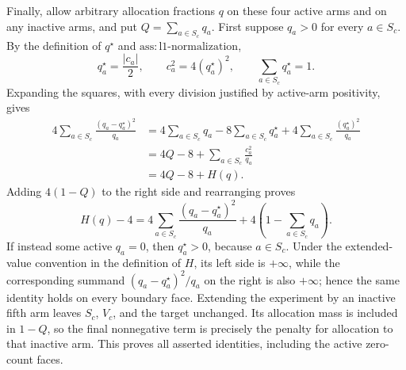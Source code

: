 Finally, allow arbitrary allocation fractions \(q\) on these four active arms and on any inactive arms, and put \(Q=\sum_{a\in S_c}q_a\).  First suppose \(q_a>0\) for every \(a\in S_c\).  By the definition of \(q^\star\) and \(\mathrm{ass:l1\text{-}normalization}\),
\[
 q_a^\star=\frac{|c_a|}{2},\qquad
 c_a^2=4(q_a^\star)^2,
 \qquad
 \sum_{a\in S_c}q_a^\star=1.
\]
Expanding the squares, with every division justified by active-arm positivity, gives
\[
\begin{aligned}
4\sum_{a\in S_c}\frac{(q_a-q_a^\star)^2}{q_a}
&=4\sum_{a\in S_c}q_a
  -8\sum_{a\in S_c}q_a^\star
  +4\sum_{a\in S_c}\frac{(q_a^\star)^2}{q_a}\\
&=4Q-8+\sum_{a\in S_c}\frac{c_a^2}{q_a}\\
&=4Q-8+H(q).
\end{aligned}
\]
Adding \(4(1-Q)\) to the right side and rearranging proves
\[
 H(q)-4
 =4\sum_{a\in S_c}\frac{(q_a-q_a^\star)^2}{q_a}
  +4\left(1-\sum_{a\in S_c}q_a\right).
\]
If instead some active \(q_a=0\), then \(q_a^\star>0\), because \(a\in S_c\).  Under the extended-value convention in the definition of \(H\), its left side is \(+\infty\), while the corresponding summand \((q_a-q_a^\star)^2/q_a\) on the right is also \(+\infty\); hence the same identity holds on every boundary face.  Extending the experiment by an inactive fifth arm leaves \(S_c\), \(V_c\), and the target unchanged.  Its allocation mass is included in \(1-Q\), so the final nonnegative term is precisely the penalty for allocation to that inactive arm.  This proves all asserted identities, including the active zero-count faces.
